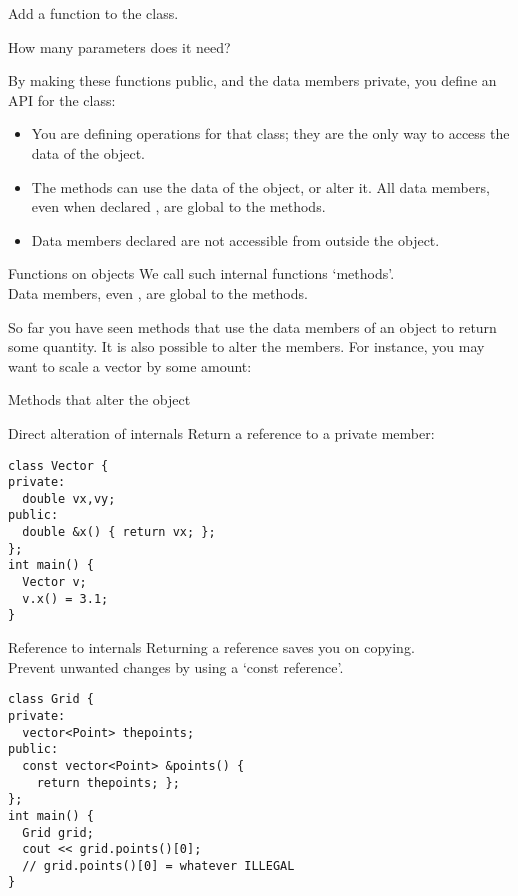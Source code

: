 \begin{exercise}
  \label{ex:vectorclass-print}
  Add a  function to the  class.

  How many parameters does it need?
\end{exercise}

By making these functions public, and the data members
private, you define an \acf{API} for the class:
\begin{itemize}
\item You are defining operations for that class; they are the only
  way to access the data of the object.
\item The methods can use the data of the object, or alter it. All
  data members, even when declared , are global to the methods.
\item  Data members declared  are not accessible from outside the
  object.
\end{itemize}

\begin{slide}{Functions on objects}
  \label{sl:obj-func}
  We call such internal functions `methods'.\\
  Data members, even , are global to the methods.
\end{slide}

So far you have seen methods that use the data members of an object to
return some quantity. It is also possible to alter the members. 
For instance, you may want to scale a vector by some amount:
%

\begin{slide}{Methods that alter the object}
  \label{sl:obj-func-on}
\end{slide}

\begin{block}{Direct alteration of internals}
  \label{sl:obj-return-ref}
  Return a reference to a private member:
\begin{lstlisting}
class Vector {
private:
  double vx,vy;
public:
  double &x() { return vx; };
};
int main() {
  Vector v;
  v.x() = 3.1;
}
\end{lstlisting}
\end{block}

\begin{block}{Reference to internals}
  \label{sl:obj-return-const-ref}
  Returning a reference saves you on copying.\\
  Prevent unwanted changes by using a `const reference'.
\begin{lstlisting}
class Grid {
private:
  vector<Point> thepoints;
public:
  const vector<Point> &points() {
    return thepoints; };
};
int main() {
  Grid grid;
  cout << grid.points()[0];
  // grid.points()[0] = whatever ILLEGAL
}
\end{lstlisting}
\end{block}

